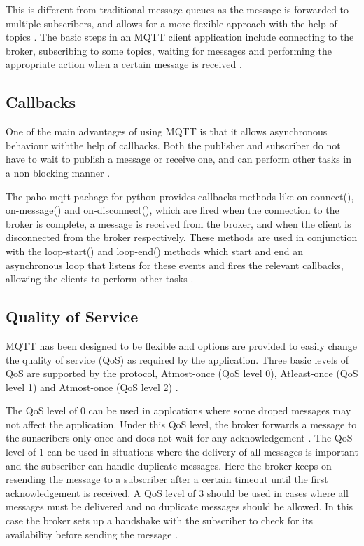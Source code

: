 \documentclass[sigconf]{acmart}
\begin{document}
This is different from traditional message queues as the message is forwarded to multiple subscribers, and allows for a more flexible approach with the help of topics \cite{hivemq-details}. The basic steps in an MQTT client application include connecting to the broker, subscribing to some topics, waiting for messages and performing the appropriate action when a certain message is received \cite{mqtt-wiki}.
 
\subsection{Callbacks}
One of the main advantages of using MQTT is that it allows asynchronous behaviour withthe help of callbacks. Both the publisher and subscriber do not have to wait to publish a message or receive one, and can perform other tasks in a non blocking manner \cite{hivemq-details} \cite{python-paho-mqtt}.

The paho-mqtt pachage for python provides callbacks methods like on-connect(), on-message() and on-disconnect(), which are fired when the connection to the broker is complete, a message is received from the broker, and when the client is disconnected from the broker respectively. These methods are used in conjunction with the loop-start() and loop-end() methods which start and end an asynchronous loop that listens for these events and fires the relevant callbacks, allowing the clients to perform other tasks \cite{python-paho-mqtt}.

\subsection{Quality of Service}
MQTT has been designed to be flexible and options are provided to easily change the quality of service (QoS) as required by the application. Three basic levels of QoS are supported by the protocol, Atmost-once (QoS level 0), Atleast-once (QoS level 1) and Atmost-once (QoS level 2) \cite{hivemq-qos}\cite{python-paho-mqtt}.

The QoS level of 0 can be used in applcations where some droped messages may not affect the application. Under this QoS level, the broker forwards a message to the sunscribers only once and does not wait for any acknowledgement \cite{hivemq-qos} \cite{python-paho-mqtt}.
The QoS level of 1 can be used in situations where the delivery of all messages is important and the subscriber can handle duplicate messages. Here the broker keeps on resending the message to a subscriber after a certain timeout until the first acknowledgement is received.
A QoS level of 3 should be used in cases where all messages must be delivered and no duplicate messages should be allowed. In this case the broker sets up a handshake with the subscriber to check for its availability before sending the message \cite{hivemq-qos} \cite{python-paho-mqtt}.
\end{document}
